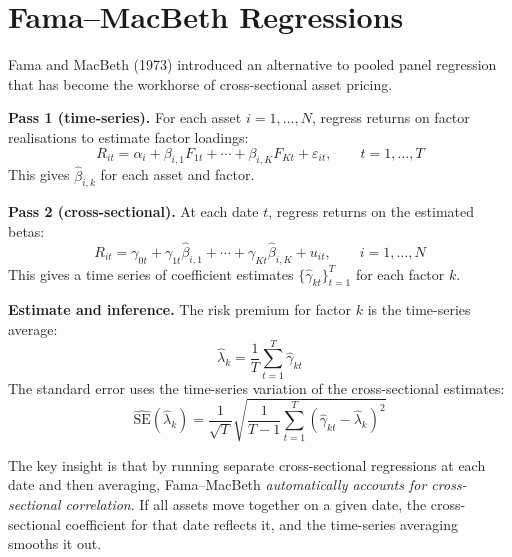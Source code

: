 \section{Fama--MacBeth Regressions}
\label{sec:panel-fm}

Fama and MacBeth (1973) introduced an alternative to pooled panel regression that has become the workhorse of cross-sectional asset pricing.

\begin{keyidea}
\textbf{Pass 1 (time-series).} For each asset $i = 1, \dots, N$, regress returns on factor realisations to estimate factor loadings:
\begin{equation}
  R_{it} = \alpha_i + \beta_{i,1} F_{1t} + \cdots + \beta_{i,K} F_{Kt} + \varepsilon_{it}, \qquad t = 1, \dots, T
  \label{eq:fm-pass1}
\end{equation}
This gives $\hat{\beta}_{i,k}$ for each asset and factor.

\textbf{Pass 2 (cross-sectional).} At each date $t$, regress returns on the estimated betas:
\begin{equation}
  R_{it} = \gamma_{0t} + \gamma_{1t} \hat{\beta}_{i,1} + \cdots + \gamma_{Kt} \hat{\beta}_{i,K} + u_{it}, \qquad i = 1, \dots, N
  \label{eq:fm-pass2}
\end{equation}
This gives a time series of coefficient estimates $\{\hat{\gamma}_{kt}\}_{t=1}^T$ for each factor $k$.

\textbf{Estimate and inference.} The risk premium for factor $k$ is the time-series average:
\begin{equation}
  \hat{\lambda}_k = \frac{1}{T}\sum_{t=1}^T \hat{\gamma}_{kt}
  \label{eq:fm-lambda}
\end{equation}
The standard error uses the time-series variation of the cross-sectional estimates:
\begin{equation}
  \widehat{\text{SE}}(\hat{\lambda}_k) = \frac{1}{\sqrt{T}} \sqrt{\frac{1}{T-1}\sum_{t=1}^T (\hat{\gamma}_{kt} - \hat{\lambda}_k)^2}
  \label{eq:fm-se}
\end{equation}
\end{keyidea}

The key insight is that by running separate cross-sectional regressions at each date and then averaging, Fama--MacBeth \emph{automatically accounts for cross-sectional correlation}.
If all assets move together on a given date, the cross-sectional coefficient for that date reflects it, and the time-series averaging smooths it out.

